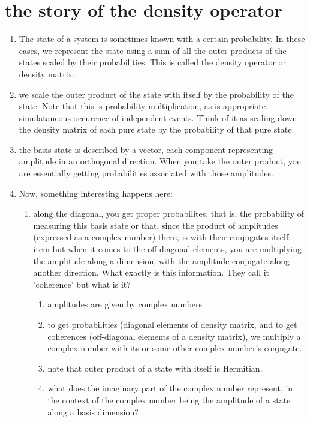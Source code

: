 \documentclass[a4paper,12pt]{amsbook}
\newcommand{\0}{{$|0\rangle$}}
\newcommand{\1}{{$|1\rangle$}}
\begin{document}
\section{the story of the density operator}
\begin{enumerate}
    \item The state of a system is sometimes known with a certain probability. In these cases, we represent the state using a sum of all the outer products of the states scaled by their probabilities. This is called the density operator or density matrix.
    \item we scale the outer product of the state with itself by the probability of the state. Note that this is probability multiplication, as is appropriate simulataneous occurence of independent events. Think of it as scaling down the density matrix of each pure state by the probability of that pure state.
    \item the basis state is described by a vector, each component representing amplitude in an orthogonal direction. When you take the outer product, you are essentially getting probabilities associated with those amplitudes. 
    \item Now, something interesting happens here:
\begin{enumerate}
    \item along the diagonal, you get proper probabilites, that is, the probability of measuring this basis state or that, since the product of amplitudes (expressed as a complex number) there, is with their conjugates itself.
    item but when it comes to the off diagonal elements, you are multiplying the amplitude along a dimension, with the amplitude conjugate along another direction. What exactly is this information. They call it 'coherence' but what is it?
    \begin{enumerate}
        \item amplitudes are given by complex numbers
        \item to get probabilities (diagonal elements of density matrix, and to get coherences (off-diagonal elements of a density matrix), we multiply a complex number with its or some other complex number's conjugate. 
        \item note that outer product of a state with itself is Hermitian.
        \item what does the imaginary part of the complex number represent, in the context of the complex number being the amplitude of a state along a basis dimension?
    \end{enumerate}
\end{enumerate}
\end{enumerate}
\end{document}

